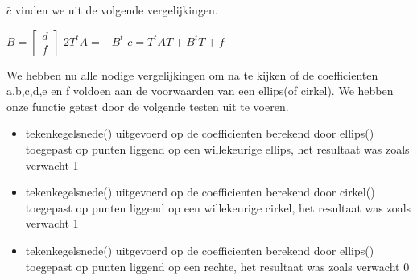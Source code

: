 \documentclass[]{article}
\begin{document}
\noindent $\bar{c}$ vinden we uit de volgende vergelijkingen.


\begin{center}
      $		B
		=
     \begin{bmatrix}
      d \\
      f
      \end{bmatrix}
      $
      \quad \quad \quad
      $2T^tA = -B^t$
      \quad \quad \quad
      $\bar{c} = T^tAT + B^tT +f$
      \end{center}

\noindent We hebben nu alle nodige vergelijkingen om na te kijken of de coefficienten a,b,c,d,e en f voldoen aan de voorwaarden van een ellips(of cirkel). We hebben onze functie getest door de volgende testen uit te voeren.


\begin{itemize}
  \item tekenkegelsnede() uitgevoerd op de coefficienten berekend door ellips() toegepast op punten liggend op een willekeurige ellips, het resultaat was zoals verwacht 1
  \item tekenkegelsnede() uitgevoerd op de coefficienten berekend door cirkel() toegepast op punten liggend op een willekeurige cirkel, het resultaat was zoals verwacht 1
  \item tekenkegelsnede() uitgevoerd op de coefficienten berekend door ellips() toegepast op punten liggend op een rechte, het resultaat was zoals verwacht 0
\end{itemize}
\end{document}
